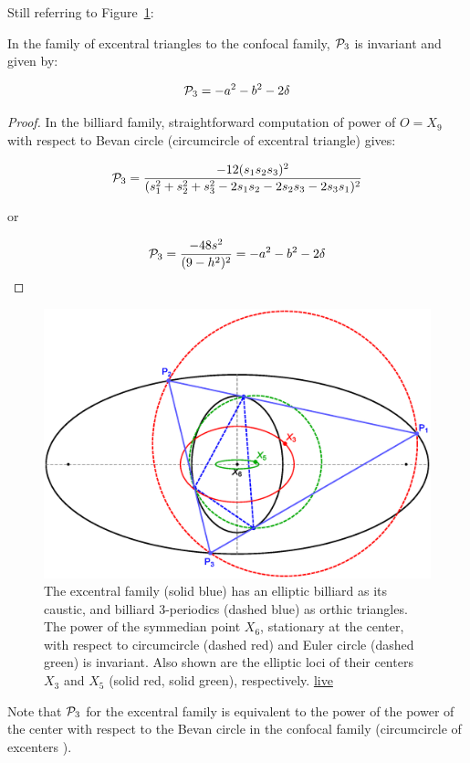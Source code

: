 Still referring to Figure~\ref{fig:excentral}:

\begin{proposition}
In the family of excentral triangles to the confocal family, $\P_3$ is invariant and given by:

\[ \P_3 = -a^2-b^2-2\delta \]
\end{proposition}

\begin{proof}

In the billiard family, straightforward computation of power of $O=X_9$ with respect to Bevan circle (circumcircle of excentral triangle) gives:

\[ \P_3 = \frac{ -12 (s_1 s_2 s_3)^2 }{ (s_1^2 + s_2^2 + s_3^2 - 2 s_1 s_2 - 2 s_2 s_3 - 2 s_3 s_1)^2 }\]

or

\[ \P_3 = \frac{ -48 s^2 }{ (9 - h^2)^2 } =  -a^2-b^2-2\delta \]

\end{proof}

\begin{figure}
    \centering
    \includegraphics[width=.8\textwidth]{pics/0135_n3_excentral.eps}
    \caption{The excentral family (solid blue) has an elliptic billiard as its caustic, and billiard 3-periodics (dashed blue) as orthic triangles. The power of the symmedian point $X_6$, stationary at the center, with respect to circumcircle (dashed red) and Euler circle (dashed green) is invariant. Also shown are the elliptic loci of their centers $X_3$ and $X_5$ (solid red, solid green), respectively. \href{https://bit.ly/3tV16iY}{live}}
    \label{fig:excentral}
\end{figure}

Note that $\P_3$ for the excentral family is equivalent to the power of the power of the center with respect to the Bevan circle in the confocal family (circumcircle of excenters \cite[Bevan Circle]{mw}).

